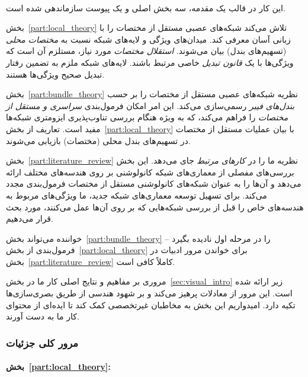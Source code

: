 

\setcounter{tocdepth}{2} %
\tableofcontents

~ %

این کار در قالب یک مقدمه، سه بخش اصلی و یک پیوست سازماندهی شده است.

بخش~\ref{part:local_theory} تلاش می‌کند شبکه‌های عصبی مستقل از مختصات را با زبانی آسان معرفی کند.
میدان‌های ویژگی و لایه‌های شبکه نسبت به \emph{مختصات محلی} (تسهیم‌های بندل) بیان می‌شوند.
\emph{استقلال مختصات} مورد نیاز، مستلزم آن است که ویژگی‌ها با یک \emph{قانون تبدیل} خاصی مرتبط باشند.
لایه‌های شبکه ملزم به تضمین رفتار تبدیل صحیح ویژگی‌ها هستند.

بخش~\ref{part:bundle_theory} نظریه شبکه‌های عصبی مستقل از مختصات را بر حسب \emph{بندل‌های فیبر} رسمی‌سازی می‌کند.
این امر امکان فرمول‌بندی \emph{سراسری و مستقل از مختصات} را فراهم می‌کند، که به ویژه هنگام بررسی تناوب‌پذیری ایزومتری شبکه‌ها مفید است.
تعاریف از بخش~\ref{part:local_theory} با بیان عملیات مستقل از مختصات در تسهیم‌های بندل محلی (مختصات) بازیابی می‌شوند.

بخش~\ref{part:literature_review} نظریه ما را در \emph{کارهای مرتبط} جای می‌دهد.
این بخش بررسی‌های مفصلی از معماری‌های شبکه کانولوشنی بر روی هندسه‌های مختلف ارائه می‌دهد و آن‌ها را به عنوان شبکه‌های کانولوشنی مستقل از مختصات فرمول‌بندی مجدد می‌کند.
برای تسهیل توسعه معماری‌های شبکه جدید، ما ویژگی‌های مربوط به هندسه‌های خاص را قبل از بررسی شبکه‌هایی که بر روی آن‌ها عمل می‌کنند، مورد بحث قرار می‌دهیم.

خواننده می‌تواند بخش~\ref{part:bundle_theory} را در مرحله اول نادیده بگیرد
-- فرمول‌بندی از بخش~\ref{part:local_theory} برای خواندن مرور ادبیات در بخش~\ref{part:literature_review} کاملاً کافی است.

مروری بر مفاهیم و نتایج اصلی کار ما در بخش~\ref{sec:visual_intro} زیر ارائه شده است.
این مرور از معادلات پرهیز می‌کند و بر شهود هندسی از طریق بصری‌سازی‌ها تکیه دارد.
امیدواریم این بخش به مخاطبان غیرتخصصی کمک کند تا ایده‌ای از محتوای کار ما به دست آورند.


\subsubsection*{مرور کلی جزئیات}


\paragraph{بخش~\ref{part:local_theory}:}

